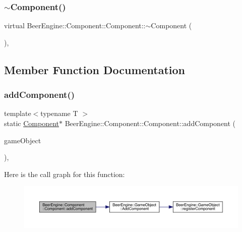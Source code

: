 \subsubsection{\texorpdfstring{$\sim$\+Component()}{~Component()}}
{\footnotesize\ttfamily virtual Beer\+Engine\+::\+Component\+::\+Component\+::$\sim$\+Component (\begin{DoxyParamCaption}\item[{void}]{ }\end{DoxyParamCaption})\hspace{0.3cm}{\ttfamily [inline]}, {\ttfamily [virtual]}}



\subsection{Member Function Documentation}
\mbox{\label{class_beer_engine_1_1_component_1_1_component_aeab2d433593f452807e81d1ada9f4c17}} 
\subsubsection{\texorpdfstring{add\+Component()}{addComponent()}}
{\footnotesize\ttfamily template$<$typename T $>$ \\
static \mbox{\hyperlink{class_beer_engine_1_1_component_1_1_component}{Component}}$\ast$ Beer\+Engine\+::\+Component\+::\+Component\+::add\+Component (\begin{DoxyParamCaption}\item[{\mbox{\hyperlink{class_beer_engine_1_1_game_object}{Game\+Object}} $\ast$}]{game\+Object }\end{DoxyParamCaption})\hspace{0.3cm}{\ttfamily [inline]}, {\ttfamily [static]}}

Here is the call graph for this function\+:
\nopagebreak
\begin{figure}[H]
\begin{center}
\leavevmode
\includegraphics[width=350pt]{class_beer_engine_1_1_component_1_1_component_aeab2d433593f452807e81d1ada9f4c17_cgraph}
\end{center}
\end{figure}
\mbox{\label{class_beer_engine_1_1_component_1_1_component_a646c01f1d1d951e58431a80f68778b84}} 
